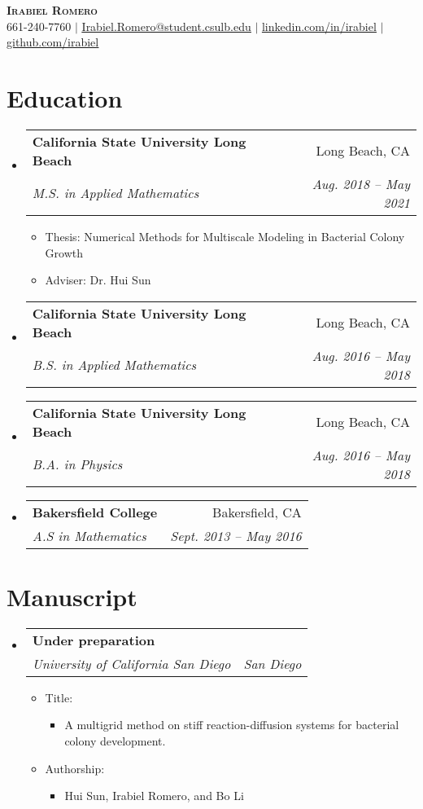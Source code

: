\documentclass[letterpaper,11pt]{article}
\makeatletter
\newcommand{\resumeItem}[1]{
  \item\small{
    {#1 \vspace{-2pt}}
  }
}
\newcommand{\resumeSubheading}[4]{
  \vspace{-2pt}\item
    \begin{tabular*}{0.97\textwidth}[t]{l@{\extracolsep{\fill}}r}
      \textbf{#1} & #2 \\
      \textit{\small#3} & \textit{\small #4} \\
    \end{tabular*}\vspace{-7pt}
}
\newcommand{\resumeSubHeadingListStart}{\begin{itemize}[leftmargin=0.15in, label={}]}
\newcommand{\resumeSubHeadingListEnd}{\end{itemize}}
\newcommand{\resumeItemListStart}{\begin{itemize}}
\newcommand{\resumeItemListEnd}{\end{itemize}\vspace{-5pt}}
\makeatother
\begin{document}

\begin{center}
    \textbf{\Huge \scshape Irabiel Romero} \\ \vspace{1pt}
    \small 661-240-7760 $|$ \href{mailto:x@x.com}{\underline{Irabiel.Romero@student.csulb.edu}} $|$ 
    \href{https://linkedin.com/in/...}{\underline{linkedin.com/in/irabiel}} $|$
    \href{https://github.com/...}{\underline{github.com/irabiel}}
\end{center}


\section{Education}
  \resumeSubHeadingListStart
    \resumeSubheading
      {California State University Long Beach }{Long Beach, CA}
      {M.S. in Applied Mathematics	}{Aug. 2018 -- May 2021}
        \resumeItemListStart
            \resumeItem{Thesis: Numerical Methods for Multiscale Modeling in Bacterial Colony Growth}
            \resumeItem{Adviser: Dr. Hui Sun }
        \resumeItemListEnd
    \resumeSubheading
      {California State University Long Beach }{Long Beach, CA}
      {B.S. in Applied Mathematics 	}{Aug. 2016 -- May 2018}
      \resumeSubheading
      {California State University Long Beach}{Long Beach, CA}
      {B.A. in Physics 	}{Aug. 2016 -- May 2018}
      \resumeSubheading
      {Bakersfield College 	}{Bakersfield, CA}
      {A.S in Mathematics}{Sept. 2013 -- May 2016}
  \resumeSubHeadingListEnd

\section{Manuscript}
  \resumeSubHeadingListStart
    \resumeSubheading
      {Under preparation}{}
      {University of California San Diego}{San Diego}
      \resumeItemListStart
        \resumeItem{Title:}
            \resumeItemListStart
                \resumeItem{A multigrid method on stiff reaction-diffusion systems for bacterial colony development.}
            \resumeItemListEnd
        \resumeItem{Authorship:}
            \resumeItemListStart
                \resumeItem{Hui Sun, Irabiel Romero, and Bo Li}
            \resumeItemListEnd
      \resumeItemListEnd
  \resumeSubHeadingListEnd
\end{document}
